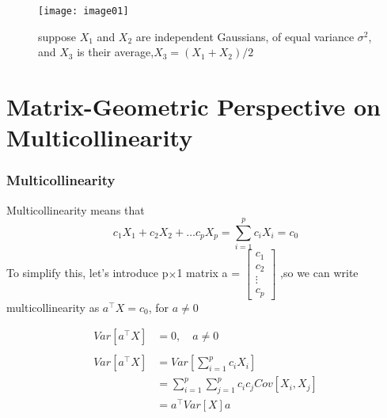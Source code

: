 \documentclass{beamer}
\begin{document}
    \begin{frame}
    \frametitle{}
    \begin{figure}[h]
	\begin{center}
		\texttt{[image: image01]}
	\end{center}
	\caption{suppose $X_1$ and $X_2$ are independent Gaussians, of equal variance $\sigma^2$, and $X_3$ is their average,$X_3 = \left( X_1 + X_2 \right)/ 2$}
    \end{figure}
    \end{frame}
    
    
\section{Matrix-Geometric Perspective on Multicollinearity}
    \begin{frame}
    \frametitle{Multicollinearity}
    Multicollinearity means that
    \begin{equation*}
    	c_1X_1+c_2X_2+\hdots  c_pX_p=\sum_{i=1}^{p}c_iX_i=c_0
    \end{equation*}
    To simplify this, let's introduce p$\times$1 matrix
    a = $\begin{bmatrix}
	c_1
	\\c_2
	\\\vdots 
	\\c_p
    \end{bmatrix}$
    ,so we can write multicollinearity as    $a^\intercal X = c_0$, for $a \neq 0$
    \end{frame}
   
	\begin{frame}
	\begin{equation*}
	\begin{aligned}
	Var\left[ a^\intercal X\right] &= 0,\quad a \neq 0
	\\\mbox{}
	\\Var\left[ a^\intercal X\right] &= Var\left[ \sum_{i=1}^{p} c_i X_i\right]
	\\&=\sum_{i=1}^{p}\sum_{j=1}^{p}c_ic_j Cov\left[ X_i, X_j\right] 
	\\&=a^\intercal Var\left[ X\right] a
	\end{aligned}
	\end{equation*}
    \end{frame}
	
\end{document}
